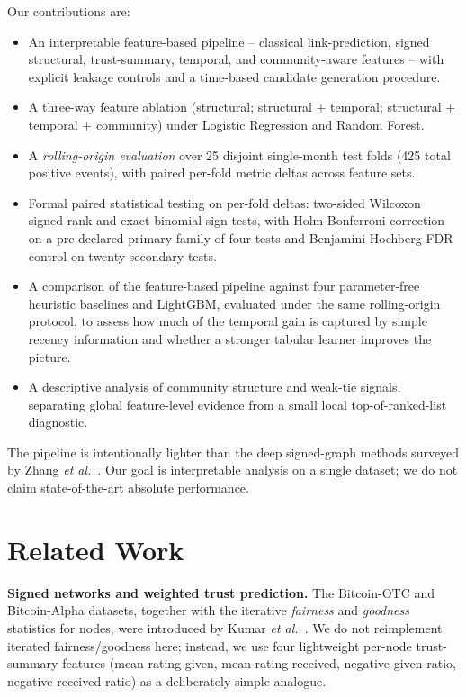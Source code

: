 \documentclass[conference]{IEEEtran}
\begin{document}
Our contributions are:
\begin{itemize}
\item An interpretable feature-based pipeline -- classical
link-prediction, signed structural, trust-summary, temporal, and
community-aware features -- with explicit leakage controls and a
time-based candidate generation procedure.
\item A three-way feature ablation (structural; structural + temporal;
structural + temporal + community) under Logistic Regression and
Random Forest.
\item A \emph{rolling-origin evaluation} over 25 disjoint single-month
test folds (425 total positive events), with paired per-fold metric
deltas across feature sets.
\item Formal paired statistical testing on per-fold deltas: two-sided
Wilcoxon signed-rank and exact binomial sign tests, with
Holm-Bonferroni correction on a pre-declared primary family of four
tests and Benjamini-Hochberg FDR control on twenty secondary tests.
\item A comparison of the feature-based pipeline against four
parameter-free heuristic baselines and LightGBM, evaluated under the
same rolling-origin protocol, to assess how much of the temporal
gain is captured by simple recency information and whether a stronger
tabular learner improves the picture.
\item A descriptive analysis of community structure and weak-tie
signals, separating global feature-level evidence from a small local
top-of-ranked-list diagnostic.
\end{itemize}

The pipeline is intentionally lighter than the deep signed-graph
methods surveyed by Zhang \emph{et al.}~\cite{zhang2024}. Our goal is
interpretable analysis on a single dataset; we do not claim
state-of-the-art absolute performance.

\section{Related Work}

\textbf{Signed networks and weighted trust prediction.} The
Bitcoin-OTC and Bitcoin-Alpha datasets, together with the iterative
\emph{fairness} and \emph{goodness} statistics for nodes, were
introduced by Kumar \emph{et al.}~\cite{kumar2016}. We do not
reimplement iterated fairness/goodness here; instead, we use four
lightweight per-node trust-summary features (mean rating given, mean
rating received, negative-given ratio, negative-received ratio) as a
deliberately simple analogue.
\end{document}
